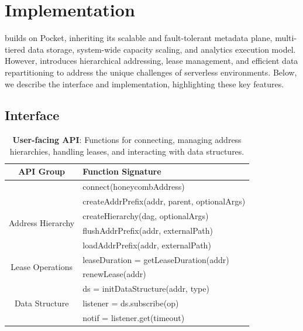 \section{\jiffy Implementation}
\label{sec:jiffyimplementation}

\jiffy builds on Pocket, inheriting its scalable and fault-tolerant metadata plane, multi-tiered data storage, system-wide capacity scaling, and analytics execution model. However, \jiffy introduces hierarchical addressing, lease management, and efficient data repartitioning to address the unique challenges of serverless environments. Below, we describe the \jiffy interface and implementation, highlighting these key features.

\subsection{\jiffy Interface}
\label{ssec:jiffyapi}

\begin{table}[t]
    \centering
    \footnotesize
    \begin{tabular}{c|l}
        \hline
        \textbf{API Group} & \textbf{Function Signature} \\
        \hline
        \multicolumn{1}{c|}{} & connect(honeycombAddress) \\
        \hline
        \multirow{4}{*}{Address Hierarchy} 
            & createAddrPrefix(addr, parent, optionalArgs) \\
            & createHierarchy(dag, optionalArgs) \\
            & flushAddrPrefix(addr, externalPath) \\
            & loadAddrPrefix(addr, externalPath) \\
        \hline
        \multirow{2}{*}{Lease Operations} 
            & leaseDuration = getLeaseDuration(addr) \\
            & renewLease(addr) \\
        \hline
        \multirow{3}{*}{Data Structure}
            & ds = initDataStructure(addr, type) \\
            & listener = ds.subscribe(op) \\
            & notif = listener.get(timeout) \\
        \hline
    \end{tabular}
    \caption[\jiffy User-facing API]{\textbf{\jiffy User-facing API}: Functions for connecting, managing address hierarchies, handling leases, and interacting with data structures.}
    \label{table:api}
\end{table}



